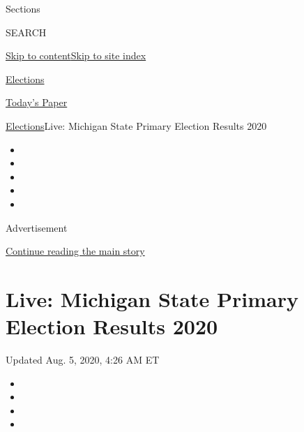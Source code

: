 Sections

SEARCH

\protect\hyperlink{site-content}{Skip to
content}\protect\hyperlink{site-index}{Skip to site index}

\href{https://www.nytimes.com/news-event/2020-election}{Elections}

\href{https://myaccount.nytimes.com/auth/login?response_type=cookie\&client_id=vi}{}

\href{https://www.nytimes.com/section/todayspaper}{Today's Paper}

\href{/news-event/2020-election}{Elections}\textbar{}Live: Michigan
State Primary Election Results 2020

\begin{itemize}
\item
\item
\item
\item
\item
\end{itemize}

Advertisement

\protect\hyperlink{after-top}{Continue reading the main story}

\hypertarget{live-michigan-state-primary-election-results-2020}{%
\section{Live: Michigan State Primary Election Results
2020}\label{live-michigan-state-primary-election-results-2020}}

Updated Aug. 5, 2020, 4:26 AM ET

\begin{itemize}
\item
\item
\item
\item
\end{itemize}

